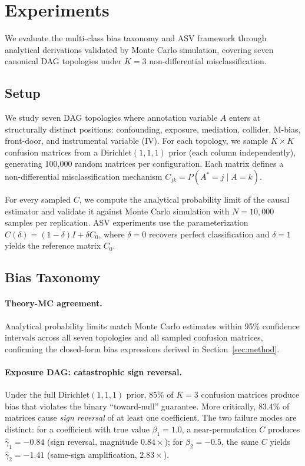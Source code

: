 \section{Experiments}
\label{sec:experiments}

We evaluate the multi-class bias taxonomy and ASV framework through analytical derivations validated by Monte Carlo simulation, covering seven canonical DAG topologies under $K{=}3$ non-differential misclassification.

\subsection{Setup}
\label{sec:setup}

We study seven DAG topologies where annotation variable $A$ enters at structurally distinct positions: confounding, exposure, mediation, collider, M-bias, front-door, and instrumental variable (IV). For each topology, we sample $K{\times}K$ confusion matrices from a Dirichlet$(1,1,1)$ prior (each column independently), generating 100{,}000 random matrices per configuration. Each matrix defines a non-differential misclassification mechanism $C_{jk} = P(A^*{=}j \mid A{=}k)$.

For every sampled $C$, we compute the analytical probability limit of the causal estimator and validate it against Monte Carlo simulation with $N{=}10{,}000$ samples per replication. ASV experiments use the parameterization $C(\delta) = (1{-}\delta)I + \delta C_0$, where $\delta{=}0$ recovers perfect classification and $\delta{=}1$ yields the reference matrix $C_0$.

\subsection{Bias Taxonomy}
\label{sec:taxonomy_results}

\paragraph{Theory-MC agreement.}
Analytical probability limits match Monte Carlo estimates within 95\% confidence intervals across all seven topologies and all sampled confusion matrices, confirming the closed-form bias expressions derived in Section~\ref{sec:method}.

\paragraph{Exposure DAG: catastrophic sign reversal.}
Under the full Dirichlet$(1,1,1)$ prior, 85\% of $K{=}3$ confusion matrices produce bias that violates the binary ``toward-null'' guarantee. More critically, 83.4\% of matrices cause \emph{sign reversal} of at least one coefficient. The two failure modes are distinct: for a coefficient with true value $\beta_1{=}1.0$, a near-permutation $C$ produces $\hat{\gamma}_1{=}{-}0.84$ (sign reversal, magnitude $0.84{\times}$); for $\beta_2{=}{-}0.5$, the same $C$ yields $\hat{\gamma}_2{=}{-}1.41$ (same-sign amplification, $2.83{\times}$).

